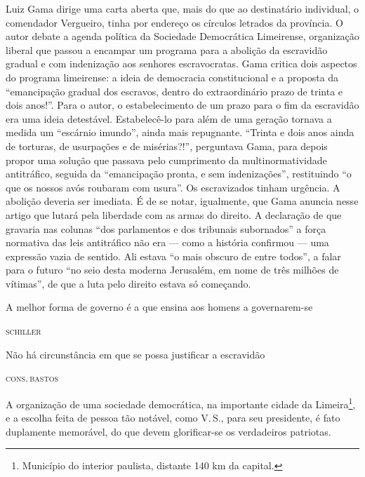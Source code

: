 \begin{didascalia}
Luiz Gama dirige uma carta aberta que, mais do que ao destinatário
individual, o comendador Vergueiro, tinha por endereço os círculos
letrados da província. O autor debate a agenda política da Sociedade
Democrática Limeirense, organização liberal que passou a encampar um
programa para a abolição da escravidão gradual e com indenização aos
senhores escravocratas. Gama critica dois aspectos do programa
limeirense: a ideia de democracia constitucional e a proposta da
``emancipação gradual dos escravos, dentro do extraordinário prazo de
trinta e dois anos!''. Para o autor, o estabelecimento de um prazo para o
fim da escravidão era uma ideia detestável. Estabelecê-lo para além de
uma geração tornava a medida um ``escárnio imundo'', ainda mais
repugnante. ``Trinta e dois anos ainda de torturas, de usurpações e de
misérias?!'', perguntava Gama, para depois propor uma solução que passava
pelo cumprimento da multinormatividade antitráfico, seguida da
``emancipação pronta, e sem indenizações'', restituindo ``o que os nossos
avós roubaram com usura''. Os escravizados tinham urgência. A abolição
deveria ser imediata. É de se notar, igualmente, que Gama anuncia nesse
artigo que lutará pela liberdade com as armas do direito. A declaração
de que gravaria nas colunas ``dos parlamentos e dos tribunais subornados''
a força normativa das leis antitráfico não era --- como a história
confirmou --- uma expressão vazia de sentido. Ali estava ``o mais obscuro
de entre todos'', a falar para o futuro ``no seio desta moderna Jerusalém,
em nome de três milhões de vítimas'', de que a luta pelo direito estava
só começando.
\end{didascalia}



\epigraph{A melhor forma de governo é a que ensina aos homens a governarem-se}{\textsc{schiller}\footnotemark}

\epigraph{Não há circunstância em que se possa justificar a escravidão}{\textsc{cons.\,bastos}\footnotemark}

A organização de uma sociedade democrática, na importante cidade da
Limeira\footnote{Município do interior paulista, distante 140 km da
  capital.}, e a escolha feita de pessoa tão notável, como V.\,S., para
seu presidente, é fato duplamente memorável, do que devem glorificar-se
os verdadeiros patriotas.

